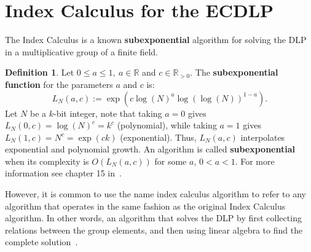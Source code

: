 \documentclass[thesis=M,english]{FITthesis}[2012/10/20]
\theoremstyle{remark}
\theoremstyle{definition}
\newtheorem{DF}{Definition}[section]
\begin{document}
\section{Index Calculus for the ECDLP}
The Index Calculus is a known \textbf{subexponential} algorithm for solving the DLP in a multiplicative group of a finite field. 
\begin{DF}
Let $0\leq a \leq 1,\ a \in \mathbb{R}$ and $c \in \mathbb{R}_{>0}$. The \textbf{subexponential function} for the parameters $a$ and $c$ is:
$$
L_N(a,c) := \exp(c\log(N)^a \log(\log(N))^{1-a}).
$$
Let $N$ be a $k$-bit integer, note that taking $a=0$ gives $L_N(0,c) = \log(N)^c = k^c$ (polynomial), while taking $a=1$ gives $L_N(1,c) = N^c = \exp(ck)$ (exponential). Thus, $L_N(a,c)$ interpolates exponential and polynomial growth. An algorithm is called \textbf{subexponential} when its complexity is $O(L_N(a,c))$ for some $a$, $0 < a < 1$. For more information see chapter 15 in~\cite{subExp}.
\end{DF} 
\noindent However, it is common to use the name index calculus algorithm to refer to any algorithm that operates in the same fashion as the original Index Calculus algorithm. In other words, an algorithm that solves the DLP by first collecting relations between the group elements, and then using linear algebra to find the complete solution~\cite{amadori17}.
\end{document}
